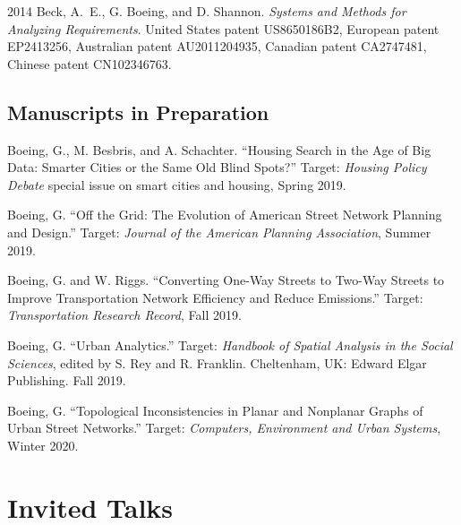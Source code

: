 \documentclass[12pt,letterpaper]{report}
\begin{document}
	\begin{tablist}

		\item[2014] \tab Beck, A.~E., G. Boeing, and D. Shannon. \textit{Systems and Methods for Analyzing Requirements}. United States patent US8650186B2, European patent EP2413256, Australian patent AU2011204935, Canadian patent CA2747481, Chinese patent CN102346763.

	\end{tablist}



	\subsection*{Manuscripts in Preparation}

	\begin{tablist}

		\item[\the\year] \tab Boeing, G., M. Besbris, and A. Schachter. \enquote{Housing Search in the Age of Big Data: Smarter Cities or the Same Old Blind Spots?} Target: \textit{Housing Policy Debate} special issue on smart cities and housing, Spring 2019.

		\item[\the\year] \tab Boeing, G. \enquote{Off the Grid: The Evolution of American Street Network Planning and Design.} Target: \textit{Journal of the American Planning Association}, Summer 2019.

		\item[\the\year] \tab Boeing, G. and W. Riggs. \enquote{Converting One-Way Streets to Two-Way Streets to Improve Transportation Network Efficiency and Reduce Emissions.} Target: \textit{Transportation Research Record}, Fall 2019.

		\item[\the\year] \tab Boeing, G. \enquote{Urban Analytics.} Target: \textit{Handbook of Spatial Analysis in the Social Sciences}, edited by S. Rey and R. Franklin. Cheltenham, UK: Edward Elgar Publishing. Fall 2019.

		\item[\the\year] \tab Boeing, G. \enquote{Topological Inconsistencies in Planar and Nonplanar Graphs of Urban Street Networks.} Target: \textit{Computers, Environment and Urban Systems}, Winter 2020.

	\end{tablist}



	\section*{Invited Talks}
\end{document}
